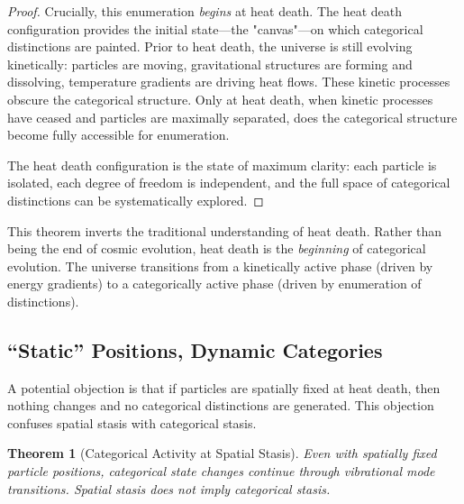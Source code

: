 \documentclass[12pt,a4paper]{article}
\newtheorem{theorem}{Theorem}[section]
\theoremstyle{definition}
\theoremstyle{remark}
\begin{document}
\begin{proof}
Crucially, this enumeration \emph{begins} at heat death. The heat death configuration provides the initial state—the "canvas"—on which categorical distinctions are painted. Prior to heat death, the universe is still evolving kinetically: particles are moving, gravitational structures are forming and dissolving, temperature gradients are driving heat flows. These kinetic processes obscure the categorical structure. Only at heat death, when kinetic processes have ceased and particles are maximally separated, does the categorical structure become fully accessible for enumeration.

The heat death configuration is the state of maximum clarity: each particle is isolated, each degree of freedom is independent, and the full space of categorical distinctions can be systematically explored.
\end{proof}

This theorem inverts the traditional understanding of heat death. Rather than being the end of cosmic evolution, heat death is the \emph{beginning} of categorical evolution. The universe transitions from a kinetically active phase (driven by energy gradients) to a categorically active phase (driven by enumeration of distinctions).

\subsection{``Static'' Positions, Dynamic Categories}

A potential objection is that if particles are spatially fixed at heat death, then nothing changes and no categorical distinctions are generated. This objection confuses spatial stasis with categorical stasis.

\begin{theorem}[Categorical Activity at Spatial Stasis]
\label{thm:spatial_stasis}
Even with spatially fixed particle positions, categorical state changes continue through vibrational mode transitions. Spatial stasis does not imply categorical stasis.
\end{theorem}
\end{document}
